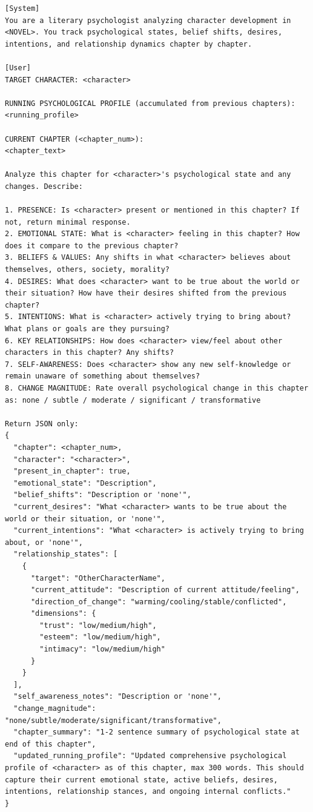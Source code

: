 \documentclass[11pt]{article}
\begin{document}
\begin{table}[htbp]
\centering
\caption{Stage~i state-stream prompt.}
\label{tab:prompt-state-stream}
\begin{lstlisting}[basicstyle=\ttfamily\scriptsize]
[System]
You are a literary psychologist analyzing character development in <NOVEL>. You track psychological states, belief shifts, desires, intentions, and relationship dynamics chapter by chapter.

[User]
TARGET CHARACTER: <character>

RUNNING PSYCHOLOGICAL PROFILE (accumulated from previous chapters):
<running_profile>

CURRENT CHAPTER (<chapter_num>):
<chapter_text>

Analyze this chapter for <character>'s psychological state and any changes. Describe:

1. PRESENCE: Is <character> present or mentioned in this chapter? If not, return minimal response.
2. EMOTIONAL STATE: What is <character> feeling in this chapter? How does it compare to the previous chapter?
3. BELIEFS & VALUES: Any shifts in what <character> believes about themselves, others, society, morality?
4. DESIRES: What does <character> want to be true about the world or their situation? How have their desires shifted from the previous chapter?
5. INTENTIONS: What is <character> actively trying to bring about? What plans or goals are they pursuing?
6. KEY RELATIONSHIPS: How does <character> view/feel about other characters in this chapter? Any shifts?
7. SELF-AWARENESS: Does <character> show any new self-knowledge or remain unaware of something about themselves?
8. CHANGE MAGNITUDE: Rate overall psychological change in this chapter as: none / subtle / moderate / significant / transformative

Return JSON only:
{
  "chapter": <chapter_num>,
  "character": "<character>",
  "present_in_chapter": true,
  "emotional_state": "Description",
  "belief_shifts": "Description or 'none'",
  "current_desires": "What <character> wants to be true about the world or their situation, or 'none'",
  "current_intentions": "What <character> is actively trying to bring about, or 'none'",
  "relationship_states": [
    {
      "target": "OtherCharacterName",
      "current_attitude": "Description of current attitude/feeling",
      "direction_of_change": "warming/cooling/stable/conflicted",
      "dimensions": {
        "trust": "low/medium/high",
        "esteem": "low/medium/high",
        "intimacy": "low/medium/high"
      }
    }
  ],
  "self_awareness_notes": "Description or 'none'",
  "change_magnitude": "none/subtle/moderate/significant/transformative",
  "chapter_summary": "1-2 sentence summary of psychological state at end of this chapter",
  "updated_running_profile": "Updated comprehensive psychological profile of <character> as of this chapter, max 300 words. This should capture their current emotional state, active beliefs, desires, intentions, relationship stances, and ongoing internal conflicts."
}
\end{lstlisting}
\end{table}
\end{document}
